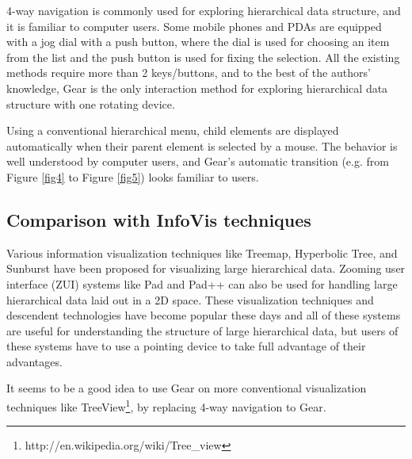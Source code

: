 \documentclass{article}
\begin{document}
4-way navigation is commonly used for exploring hierarchical data structure,
and it is familiar to computer users.
Some mobile phones and PDAs are equipped with a jog dial with a push button,
where the dial is used for choosing an item from the list and 
the push button is used for fixing the selection.
All the existing methods require more than 2 keys/buttons, and
to the best of the authors' knowledge,
Gear is the only interaction method for exploring hierarchical data structure
with one rotating device.

Using a conventional hierarchical menu,
child elements are displayed automatically when their parent element is selected by a mouse.
The behavior is well understood by computer users,
and Gear's automatic transition (e.g. from Figure \ref{fig4} to Figure \ref{fig5})
looks familiar to users.

\subsection{Comparison with InfoVis techniques}

Various information visualization techniques like
Treemap\cite{Johnson:1991:TSA:949607.949654},
Hyperbolic Tree\cite{Lamping:1995:FTB:223904.223956},
and Sunburst\cite{Stasko:2000:FDN:857190.857683}
have been proposed for visualizing large hierarchical data.
Zooming user interface (ZUI) systems like
Pad\cite{Perlin:1993:PAA:166117.166125} and
Pad++\cite{Bederson:1994:PZG:192426.192435}
can also be used for handling large hierarchical data laid out in a 2D space.
%
These visualization techniques and descendent technologies have become popular these days and
all of these systems are useful for understanding the structure of
large hierarchical data, but users of these systems have to use a pointing device
to take full advantage of their advantages.



It seems to be a good idea to use Gear on more conventional visualization techniques like
TreeView\footnote{
  \textsf{http://en.wikipedia.org/wiki/Tree\_view}
}, by replacing 4-way navigation to Gear.
\end{document}
